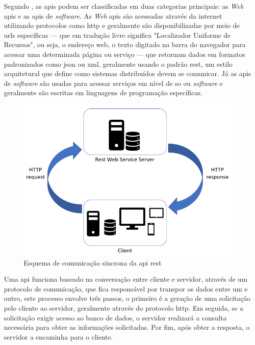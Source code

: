 Segundo \cite{martin2008codigolimpo}, as \acp{api} podem ser classificadas em duas categorias principais: as \textit{Web} \acp{api} e as \acp{api} de \textit{software}. As \textit{Web} \acp{api} são acessadas através da internet utilizando protocolos como \ac{http} e geralmente são disponibilizadas por meio de \acp{url} específicas — que em tradução livre significa "Localizador Uniforme de Recursos", ou seja, o endereço web, o texto digitado na barra do navegador para acessar uma determinada página ou serviço — que retornam dados em formatos padronizados como \ac{json} ou \ac{xml}, geralmente usando o padrão \ac{rest}, um estilo arquitetural que define como sistemas distribuídos devem se comunicar. Já as \acp{api} de \textit{software} são usadas para acessar serviços em nível de \ac{so} ou \textit{software} e geralmente são escritas em linguagens de programação específicas.

\begin{figure}[H]
\centering
  \includegraphics[width=\columnwidth]{images/REST-API-synchronous-communication-schema.png}
  \caption{Esquema de comunicação síncrona da \ac{api} \ac{rest}}
  \label{fig:REST-API}
\end{figure}

Uma \ac{api} funciona baseado na conversação entre cliente e servidor, através de um protocolo de comunicação, que fica responsável por transpor os dados entre um e outro, este processo envolve três passos, o primeiro é a geração de uma solicitação pelo cliente ao servidor, geralmente através do protocolo \ac{http}. Em seguida, se a solicitação exigir acesso ao banco de dados, o servidor realizará a consulta necessária para obter as informações solicitadas. Por fim, após obter a resposta, o servidor a encaminha para o cliente.


